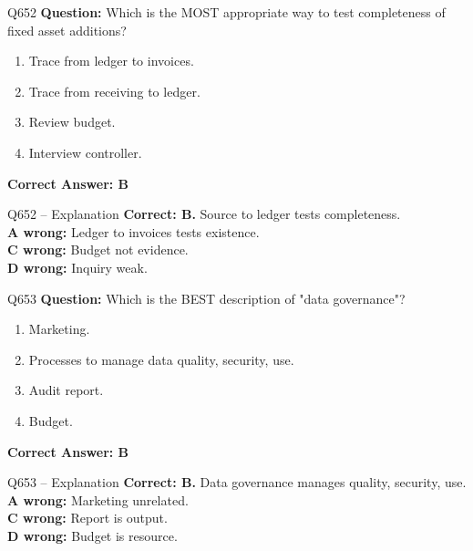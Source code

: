 \documentclass[aspectratio=169,10pt]{beamer}
\begin{document}
	\begin{frame}[t]{Q652}
		\small
		\textbf{Question:} Which is the MOST appropriate way to test completeness of fixed asset additions?
		\begin{enumerate}[label=\Alph*.,itemsep=1pt,topsep=2pt]
			\item Trace from ledger to invoices.
			\item Trace from receiving to ledger.
			\item Review budget.
			\item Interview controller.
		\end{enumerate}
		\vspace{4pt}
		\textbf{Correct Answer: B}
	\end{frame}
	
	\begin{frame}[t]{Q652 -- Explanation}
		\small
		\textbf{Correct: B.} Source to ledger tests completeness. \\[4pt]
		\textbf{A wrong:} Ledger to invoices tests existence. \\[2pt]
		\textbf{C wrong:} Budget not evidence. \\[2pt]
		\textbf{D wrong:} Inquiry weak.
	\end{frame}
	
	\begin{frame}[t]{Q653}
		\small
		\textbf{Question:} Which is the BEST description of "data governance"?
		\begin{enumerate}[label=\Alph*.,itemsep=1pt,topsep=2pt]
			\item Marketing.
			\item Processes to manage data quality, security, use.
			\item Audit report.
			\item Budget.
		\end{enumerate}
		\vspace{4pt}
		\textbf{Correct Answer: B}
	\end{frame}
	
	\begin{frame}[t]{Q653 -- Explanation}
		\small
		\textbf{Correct: B.} Data governance manages quality, security, use. \\[4pt]
		\textbf{A wrong:} Marketing unrelated. \\[2pt]
		\textbf{C wrong:} Report is output. \\[2pt]
		\textbf{D wrong:} Budget is resource.
	\end{frame}
	
\end{document}
